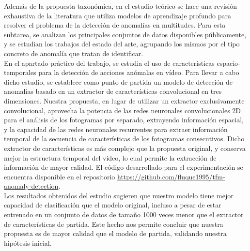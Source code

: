\documentclass[../main.tex]{memoir}
\begin{document}
Además de la propuesta taxonómica, en el estudio teórico se hace una
revisión exhaustiva de la literatura que utiliza modelos de
aprendizaje profundo para resolver el problema de la detección de
anomalías en multitudes. Para esta subtarea, se analizan los
principales conjuntos de datos disponibles públicamente, y se estudian
los trabajos del estado del arte, agrupando los mismos por el tipo
concreto de anomalía que tratan de identificar.\\

En el apartado práctico del trabajo, se estudia el uso de
características espacio-temporales para la detección de acciones
anómalas en vídeo. Para llevar a cabo dicho estudio, se establece como
punto de partida un modelo de detección de anomalías basado en un
extractor de características convolucional en tres
dimensiones. Nuestra propuesta, en lugar de utilizar un extractor
exclusivamente convolucional, aprovecha la potencia de las redes
neuronales convolucionales 2D para el análisis de los fotogramas por
separado, extrayendo información espacial, y la capacidad de las redes
neuronales recurrentes para extraer información temporal de la
secuencia de características de los fotogramas consecutivos. Dicho
extractor de características es más complejo que la propuesta
original, y conserva mejor la estructura temporal del vídeo, lo cual
permite la extracción de información de mayor calidad. El código
desarrollado para el experimentación se encuentra disponible en el
repositorio \url{https://github.com/fluque1995/tfm-anomaly-detection}.\\

Los resultados obtenidos del estudio sugieren que nuestro modelo tiene
mejor capacidad de clasificación que el modelo original, incluso a
pesar de estar entrenado en un conjunto de datos de tamaño 1000 veces
menor que el extractor de características de partida. Este hecho
nos permite concluir que nuestra propuesta es de mayor calidad que el
modelo de partida, validando nuestra hipótesis inicial.

\newpage
\end{document}

